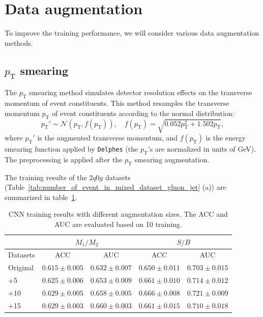 \documentclass[12pt]{article}
\begin{document}

\section{Data augmentation}%
\label{sec:data_augmentation}
    To improve the training performance, we will consider various data augmentation methods.

    \subsection{\texorpdfstring{$p_{\mathrm{T}}$}{pT} smearing}%
    \label{sub:pt_smearing}
        The $p_{\text{T}}$ smearing method simulates detector resolution effects on the transverse momentum of event constituents. This method resamples the transverse momentum $p_{\text{T}}$ of event constituents according to the normal distribution:
            \begin{equation}
                p_{\text{T}}' \sim \mathcal{N}\left( p_{\text{T}}, f(p_{\text{T}}) \right), \quad f(p_{\text{T}}) = \sqrt{0.052 p_{\text{T}}^2 + 1.502p_{\text{T}}},
            \end{equation}
            where $p_{\text{T}}'$ is the augmented transverse momentum, and $f\left( p_\text{T} \right) $ is the energy smearing function applied by \verb|Delphes| (the $p_{\text{T}}$'s are normalized in units of GeV). The preprocessing is applied after the $p_{\text{T}}$ smearing augmentation.

            The training results of the $2q0g$ datasets (Table~\ref{tab:number_of_event_in_mixed_dataset_gluon_jet} (a)) are summarized in table~\ref{tab:CWoLa_CNN_training_results_3000_jet_tagging_pT_aug_5_10}. 
        \begin{table}[htpb]
            \centering
            \caption{CNN training results with different augmentation sizes. The ACC and AUC are evaluated based on 10 training.}
            \label{tab:CWoLa_CNN_training_results_3000_jet_tagging_pT_aug_5_10}
            \begin{tabular}{l|cc|cc}
                         & \multicolumn{2}{c|}{$M_1 / M_2$}      & \multicolumn{2}{c}{$S / B$}           \\ \hline
                Datasets & ACC               & AUC               & ACC               & AUC               \\ \hline
                Original & $0.615 \pm 0.005$ & $0.632 \pm 0.007$ & $0.650 \pm 0.011$ & $0.703 \pm 0.015$ \\
                +5       & $0.625 \pm 0.006$ & $0.653 \pm 0.009$ & $0.661 \pm 0.010$ & $0.714 \pm 0.012$ \\
                +10      & $0.629 \pm 0.005$ & $0.658 \pm 0.005$ & $0.666 \pm 0.008$ & $0.721 \pm 0.009$ \\
                +15      & $0.629 \pm 0.003$ & $0.660 \pm 0.003$ & $0.661 \pm 0.015$ & $0.710 \pm 0.018$
            \end{tabular}
        \end{table}
\end{document}
